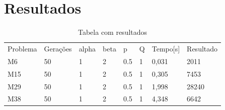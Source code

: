 \documentclass[11pt]{article}
\begin{document}
\section{Resultados}
\begin{table}[]
  \centering
  \caption{Tabela com resultados}
  \label{tab:resultados}
  \begin{tabular}{llllllll}
  \rowcolor[HTML]{000000}
  {\color[HTML]{FFFFFF} Problema} & {\color[HTML]{FFFFFF} Gerações} & {\color[HTML]{FFFFFF} alpha} & {\color[HTML]{FFFFFF} beta} & {\color[HTML]{FFFFFF} p} & {\color[HTML]{FFFFFF} Q} & {\color[HTML]{FFFFFF} Tempo{[}s{]}} & {\color[HTML]{FFFFFF} Resultado} \\
  M6                              & 50                              & 1                            & 2                           & 0.5                      & 1                        & 0,031                               & 2011                             \\
  M15                             & 50                              & 1                            & 2                           & 0.5                      & 1                        & 0,305                               & 7453                             \\
  M29                             & 50                              & 1                            & 2                           & 0.5                      & 1                        & 1,998                               & 28240                            \\
  M38                             & 50                              & 1                            & 2                           & 0.5                      & 1                        & 4,348                               & 6642
  \end{tabular}
\end{table}

\nocite{*}


\end{document}
